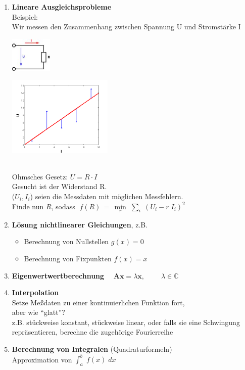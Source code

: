 \documentclass[ngerman,fontsize=11pt, paper=a4, parskip=half, titlepage=true, toc=bib]{scrbook}
\begin{document}
\begin{enumerate}
\item \textbf{Lineare Ausgleichsprobleme}\\
  Beispiel:\\
  Wir messen den Zusammenhang zwischen Spannung U und
  Stromstärke I\\
  \parbox[c]{3cm}{\includegraphics[width=2cm]{images/ohmsche.jpeg} }
  \parbox[c]{6cm}{\includegraphics[width=5cm]{images/linausgl2.png}} \\
  Ohmsches Gesetz: $U = R \cdot I$\\
  Gesucht ist der Widerstand R. \\
  ($U_i, I_i$) seien die Messdaten mit möglichen Messfehlern.\\
  Finde nun $R$, sodass 
  $\; f(R)\, =\,  \min\limits_r \; \sum\limits_i \; (U_i - r \; I_i)^2$
  
\item \textbf{Lösung nichtlinearer Gleichungen},
  z.B.
  \begin{itemize}
  \item Berechnung von Nullstellen $g(x) = 0$
  \item Berechnung von Fixpunkten $f(x) = x$
  \end{itemize}  
\item \textbf{Eigenwertwertberechnung}
  $\quad \boldsymbol A \boldsymbol x =   \lambda \boldsymbol x, \qquad \; \lambda \in \mathbb{C}$
  
  
\item \textbf{Interpolation}\\
  Setze Meßdaten zu einer kontinuierlichen Funktion fort, \\
  aber wie \enquote{glatt}?\\
  z.B. stückweise konstant, stückweise linear, oder 
  falls sie
  eine Schwingung repräsentieren, berechne die zugehörige
  Fourierreihe  
  
\item \textbf{Berechnung von Integralen} (Quadraturformeln) \\ 
  Approximation von $\int_a^b \; f(x) \; dx$
\end{enumerate}~\\
\end{document}
